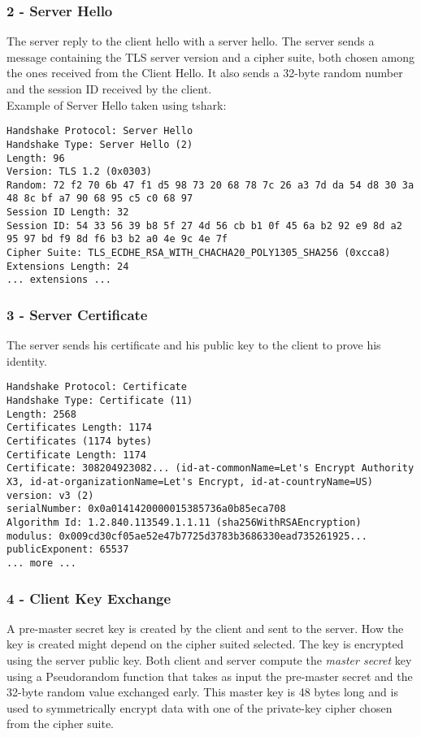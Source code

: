 \subsubsection{2 - Server Hello}
The server reply to the client hello with a server hello. The server sends a message containing the TLS server version and a cipher suite, both chosen among the ones received from the Client Hello. It also sends a 32-byte random number and the session ID received by the client.\\
Example of Server Hello taken using tshark:
\begin{lstlisting}
Handshake Protocol: Server Hello
Handshake Type: Server Hello (2)
Length: 96
Version: TLS 1.2 (0x0303)
Random: 72 f2 70 6b 47 f1 d5 98 73 20 68 78 7c 26 a3 7d da 54 d8 30 3a 48 8c bf a7 90 68 95 c5 c0 68 97
Session ID Length: 32
Session ID: 54 33 56 39 b8 5f 27 4d 56 cb b1 0f 45 6a b2 92 e9 8d a2 95 97 bd f9 8d f6 b3 b2 a0 4e 9c 4e 7f
Cipher Suite: TLS_ECDHE_RSA_WITH_CHACHA20_POLY1305_SHA256 (0xcca8)
Extensions Length: 24
... extensions ...
\end{lstlisting}

\subsubsection{3 - Server Certificate}
The server sends his certificate and his public key to the client to prove his identity.\\
\begin{lstlisting}
Handshake Protocol: Certificate
Handshake Type: Certificate (11)
Length: 2568
Certificates Length: 1174
Certificates (1174 bytes)
Certificate Length: 1174
Certificate: 308204923082... (id-at-commonName=Let's Encrypt Authority X3, id-at-organizationName=Let's Encrypt, id-at-countryName=US)
version: v3 (2)
serialNumber: 0x0a0141420000015385736a0b85eca708
Algorithm Id: 1.2.840.113549.1.1.11 (sha256WithRSAEncryption)
modulus: 0x009cd30cf05ae52e47b7725d3783b3686330ead735261925...
publicExponent: 65537
... more ...
\end{lstlisting}

\subsubsection{4 - Client Key Exchange}
A pre-master secret key is created by the client and sent to the server. How the key is created might depend on the cipher suited selected. The key is encrypted using the server public key. Both client and server compute the \emph{master secret} key using a Pseudorandom function that takes as input the pre-master secret and the 32-byte random value exchanged early. This master key is 48 bytes long and is used to symmetrically encrypt data with one of the private-key cipher chosen from the cipher suite.

